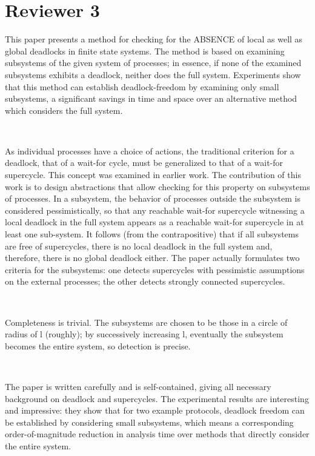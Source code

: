 \section{Reviewer 3}
This paper presents a method for checking for the ABSENCE of local as well as global deadlocks in finite state systems. The method is based on examining subsystems of the given system of processes; in essence, if none of the examined subsystems exhibits a deadlock, neither does the full system. Experiments show that this method can establish deadlock-freedom by examining only small subsystems, a significant savings in time and space over an alternative method which considers the full system.

~

As individual processes have a choice of actions, the traditional criterion for a deadlock, that of a wait-for cycle, must be generalized to that of a wait-for supercycle. This concept was examined in earlier work. The contribution of this work is to design abstractions that allow checking for this property on subsystems of processes. In a subsystem, the behavior of processes outside the subsystem is considered pessimistically, so that any reachable wait-for supercycle witnessing a local deadlock in the full system appears as a reachable wait-for supercycle in at least one sub-system. It follows (from the contrapositive) that if all subsystems are free of supercycles, there is no local deadlock in the full system and, therefore, there is no global deadlock either. The paper actually formulates two criteria for the subsystems: one detects supercycles with pessimistic assumptions on the external processes; the other detects strongly connected supercycles. 

~

Completeness is trivial. The subsystems are chosen to be those in a circle of radius of l (roughly); by successively increasing l, eventually the subsystem becomes the entire system, so detection is precise.

~


The paper is written carefully and is self-contained, giving all necessary background on deadlock and supercycles. The experimental results are interesting and impressive: they show that for two example protocols, deadlock freedom can be established by considering small subsystems, which means a corresponding order-of-magnitude reduction in analysis time over methods that directly consider the entire system. 

~

